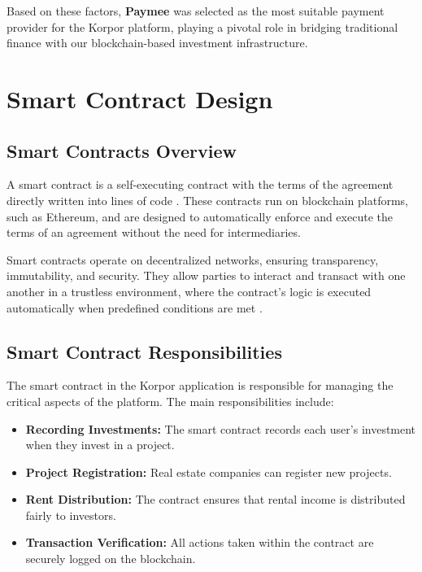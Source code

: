 Based on these factors, \textbf{Paymee} was selected as the most suitable payment provider for the Korpor platform, playing a pivotal role in bridging traditional finance with our blockchain-based investment infrastructure.

\section{Smart Contract Design}

\subsection{Smart Contracts Overview}

A smart contract is a self-executing contract with the terms of the agreement directly written into lines of code \cite{Szabo1997SmartContracts}. These contracts run on blockchain platforms, such as Ethereum, and are designed to automatically enforce and execute the terms of an agreement without the need for intermediaries. 

Smart contracts operate on decentralized networks, ensuring transparency, immutability, and security. They allow parties to interact and transact with one another in a trustless environment, where the contract's logic is executed automatically when predefined conditions are met \cite{Wohrer2018SmartContractApplications}.

\subsection{Smart Contract Responsibilities}

The smart contract in the Korpor application is responsible for managing the critical aspects of the platform. The main responsibilities include:

\begin{itemize}
    \item \textbf{Recording Investments:} The smart contract records each user's investment when they invest in a project.
    \item \textbf{Project Registration:} Real estate companies can register new projects.
    \item \textbf{Rent Distribution:} The contract ensures that rental income is distributed fairly to investors.
    \item \textbf{Transaction Verification:} All actions taken within the contract are securely logged on the blockchain.
\end{itemize}

